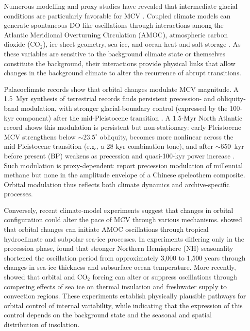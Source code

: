 \documentclass[11pt]{article}
\begin{document}
Numerous modelling and proxy studies have revealed that intermediate glacial conditions are particularly favorable for MCV \citep{barker2011800,malmierca2023dansgaard,dome2017state}. Coupled climate models can generate spontaneous DO-like oscillations through interactions among the Atlantic Meridional Overturning Circulation (AMOC), atmospheric carbon dioxide (CO$_2$), ice sheet geometry, sea ice, and ocean heat and salt storage \citep{vettoretti2022atmospheric,zhang2017abrupt,zhang2014abrupt,snoll2025competing}. As these variables are sensitive to the background climate state or themselves constitute the background, their interactions provide physical links that allow changes in the background climate to alter the recurrence of abrupt transitions.

Palaeoclimate records show that orbital changes modulate MCV magnitude. A 1.5~Myr synthesis of terrestrial records finds persistent precession- and obliquity-band modulation, with stronger glacial-boundary control (expressed by the 100-kyr component) after the mid-Pleistocene transition \citep{sun2021persistent}. A 1.5-Myr North Atlantic record shows this modulation is persistent but non-stationary: early Pleistocene MCV strengthens below \(\sim23.5^\circ\) obliquity, becomes more nonlinear across the mid-Pleistocene transition (e.g., a 28-kyr combination tone), and after \(\sim650\)~kyr before present (BP) weakens as precession and quasi-100-kyr power increase \citep{hodell20231}. Such modulation is proxy-dependent: \citet{thirumalai2020methane} report precession modulation of millennial methane but none in the amplitude envelope of a Chinese speleothem composite. Orbital modulation thus reflects both climate dynamics and archive-specific processes.

Conversely, recent climate-model experiments suggest that changes in orbital configuration could alter the pace of MCV through various mechanisms. \citet{zhang2021direct} showed that orbital changes can initiate AMOC oscillations through tropical hydroclimate and subpolar sea-ice processes. In experiments differing only in the precession phase, \citet{kuniyoshi2022effect} found that stronger Northern Hemisphere (NH) seasonality shortened the oscillation period from approximately 3,000 to 1,500 years through changes in sea-ice thickness and subsurface ocean temperature. More recently, \citet{snoll2025competing} showed that orbital and CO$_2$ forcing can alter or suppress oscillations through competing effects of sea ice on thermal insulation and freshwater supply to convection regions. These experiments establish physically plausible pathways for orbital control of internal variability, while indicating that the expression of this control depends on the background state and the seasonal and spatial distribution of insolation.
\end{document}
